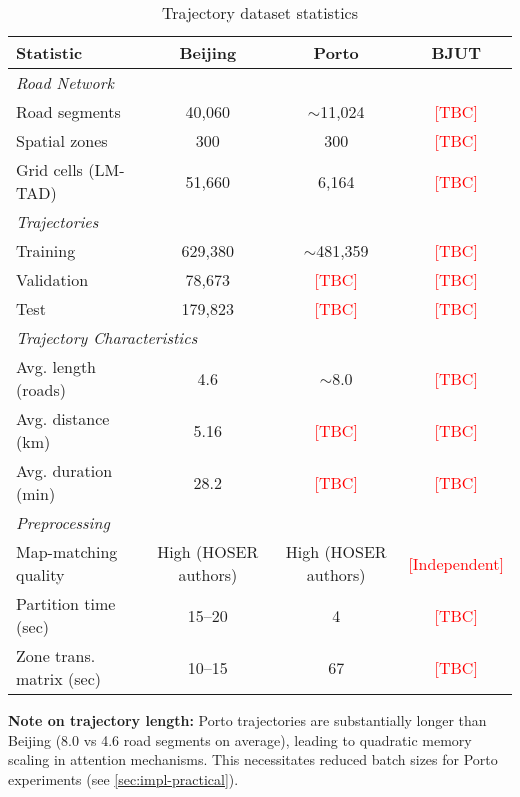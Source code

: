 \begin{table}[h]
\centering
\caption{Trajectory dataset statistics}
\label{tab:dataset-stats}
\small
\begin{tabular}{lccc}
\toprule
\textbf{Statistic} & \textbf{Beijing} & \textbf{Porto} & \textbf{BJUT} \\
\midrule
\multicolumn{4}{l}{\textit{Road Network}} \\
\quad Road segments & 40,060 & $\sim$11,024 & \textcolor{red}{[TBC]} \\
\quad Spatial zones & 300 & 300 & \textcolor{red}{[TBC]} \\
\quad Grid cells (LM-TAD) & 51,660 & 6,164 & \textcolor{red}{[TBC]} \\
\midrule
\multicolumn{4}{l}{\textit{Trajectories}} \\
\quad Training & 629,380 & $\sim$481,359 & \textcolor{red}{[TBC]} \\
\quad Validation & 78,673 & \textcolor{red}{[TBC]} & \textcolor{red}{[TBC]} \\
\quad Test & 179,823 & \textcolor{red}{[TBC]} & \textcolor{red}{[TBC]} \\
\midrule
\multicolumn{4}{l}{\textit{Trajectory Characteristics}} \\
\quad Avg. length (roads) & 4.6 & $\sim$8.0 & \textcolor{red}{[TBC]} \\
\quad Avg. distance (km) & 5.16 & \textcolor{red}{[TBC]} & \textcolor{red}{[TBC]} \\
\quad Avg. duration (min) & 28.2 & \textcolor{red}{[TBC]} & \textcolor{red}{[TBC]} \\
\midrule
\multicolumn{4}{l}{\textit{Preprocessing}} \\
\quad Map-matching quality & High (HOSER authors) & High (HOSER authors) & \textcolor{red}{[Independent]} \\
\quad Partition time (sec) & 15--20 & 4 & \textcolor{red}{[TBC]} \\
\quad Zone trans. matrix (sec) & 10--15 & 67 & \textcolor{red}{[TBC]} \\
\bottomrule
\end{tabular}
\end{table}

\textbf{Note on trajectory length:} Porto trajectories are substantially longer than Beijing (8.0 vs 4.6 road segments on average), leading to quadratic memory scaling in attention mechanisms. This necessitates reduced batch sizes for Porto experiments (see \autoref{sec:impl-practical}).


